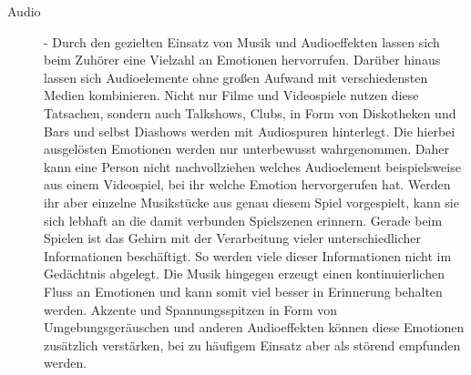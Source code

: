 \begin{description}
\item[Audio] - Durch den gezielten Einsatz von Musik und Audioeffekten lassen sich beim Zuhörer eine Vielzahl an Emotionen hervorrufen. Darüber hinaus lassen sich Audioelemente ohne großen Aufwand mit verschiedensten Medien kombinieren. Nicht nur Filme und Videospiele nutzen diese Tatsachen, sondern auch Talkshows, Clubs, in Form von Diskotheken und Bars und selbst Diashows werden mit Audiospuren hinterlegt. Die hierbei ausgelösten Emotionen werden nur unterbewusst wahrgenommen. Daher kann eine Person nicht nachvollziehen welches Audioelement beispielsweise aus einem Videospiel, bei ihr welche Emotion hervorgerufen hat. Werden ihr aber einzelne Musikstücke aus genau diesem Spiel vorgespielt, kann sie sich lebhaft an die damit verbunden Spielszenen erinnern. Gerade beim Spielen ist das Gehirn mit der Verarbeitung vieler unterschiedlicher Informationen beschäftigt. So werden viele dieser Informationen nicht im Gedächtnis abgelegt. Die Musik hingegen erzeugt einen kontinuierlichen Fluss an Emotionen und kann somit viel besser in Erinnerung behalten werden. Akzente und Spannungsspitzen in Form von Umgebungsgeräuschen und anderen Audioeffekten können diese Emotionen zusätzlich verstärken, bei zu häufigem Einsatz aber als störend empfunden werden. \cite[S. 24f.]{Adams:1515529}


\end{description}

